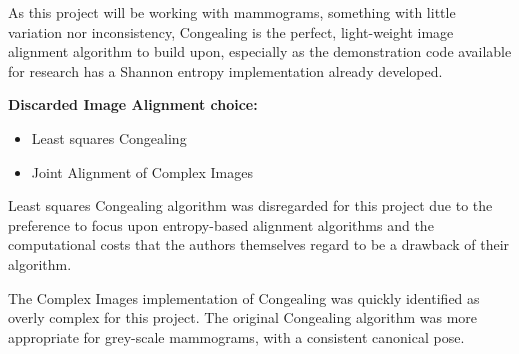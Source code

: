 As this project will be working with mammograms, something with little variation nor inconsistency, \Gls{Congealing} is the perfect, light-weight image alignment algorithm to build upon, especially as the demonstration code available for research has a Shannon entropy implementation already developed.

\textbf{Discarded Image Alignment choice:}
\begin{itemize}
    \item Least squares \gls{Congealing}
    \item Joint Alignment of Complex Images
\end{itemize}

Least squares \gls{Congealing} algorithm was disregarded for this project due to the preference to focus upon entropy-based alignment algorithms and the computational costs that the authors themselves regard to be a drawback of their algorithm.

The Complex Images implementation of \Gls{Congealing} was quickly identified as overly complex for this project. The original \Gls{Congealing} algorithm was more appropriate for grey-scale mammograms, with a consistent canonical pose.
